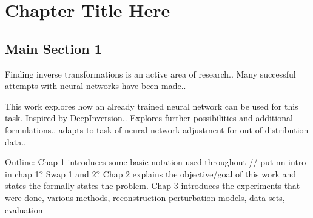 \chapter{Chapter Title Here}


\section{Main Section 1}

Finding inverse transformations is an active area of research..
Many successful attempts with neural networks have been made..

This work explores how an already trained neural network can be used for this task.
Inspired by DeepInversion..
Explores further possibilities and additional formulations.. adapts to task of 
neural network adjustment for out of distribution data..


Outline:
Chap 1 introduces some basic notation used throughout
// put nn intro in chap 1? Swap 1 and 2?
Chap 2 explains the objective/goal of this work and states the formally states the problem.
Chap 3 introduces the experiments that were done, various methods, reconstruction perturbation
models, data sets, evaluation
